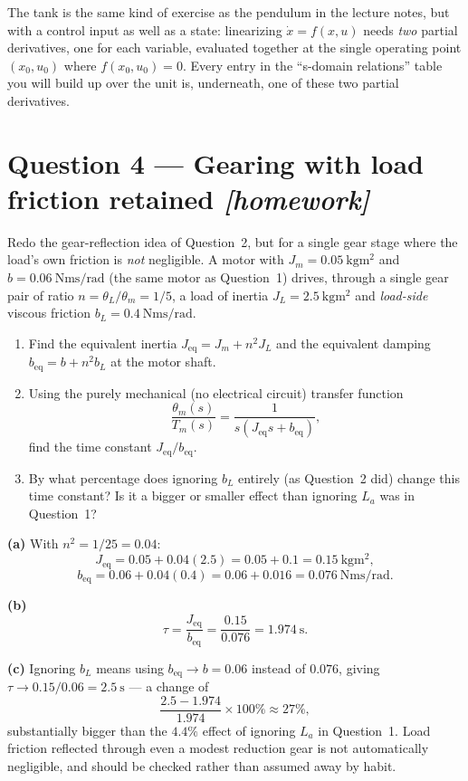\documentclass[11pt,a4paper]{article}
\newcommand{\athome}{\hfill{\small\color{fflag}\itshape[homework]}}
\begin{document}
\begin{keyidea}
The tank is the same kind of exercise as the pendulum in the lecture notes,
but with a control input as well as a state: linearizing
$\dot x=f(x,u)$ needs \emph{two} partial derivatives, one for each variable,
evaluated together at the single operating point $(x_0,u_0)$ where
$f(x_0,u_0)=0$. Every entry in the ``s-domain relations'' table you will build
up over the unit is, underneath, one of these two partial derivatives.
\end{keyidea}

\section*{Question 4 --- Gearing with load friction retained \athome}

Redo the gear-reflection idea of Question~2, but for a single gear stage where
the load's own friction is \emph{not} negligible. A motor with
$J_m=\SI{0.05}{\kilogram\metre\squared}$ and
$b=\SI{0.06}{\newton\metre\second\per\radian}$ (the same motor as
Question~1) drives, through a single gear pair of ratio
$n=\theta_L/\theta_m=1/5$, a load of inertia
$J_L=\SI{2.5}{\kilogram\metre\squared}$ and \emph{load-side} viscous friction
$b_L=\SI{0.4}{\newton\metre\second\per\radian}$.

\begin{enumerate}[label=(\alph*)]
\item Find the equivalent inertia $J_{\text{eq}}=J_m+n^2J_L$ and the
      equivalent damping $b_{\text{eq}}=b+n^2b_L$ at the motor shaft.
\item Using the purely mechanical (no electrical circuit) transfer function
      \[
        \frac{\theta_m(s)}{T_m(s)}=\frac{1}{s(J_{\text{eq}}s+b_{\text{eq}})},
      \]
      find the time constant $J_{\text{eq}}/b_{\text{eq}}$.
\item By what percentage does ignoring $b_L$ entirely (as Question~2 did)
      change this time constant? Is it a bigger or smaller effect than
      ignoring $L_a$ was in Question~1?
\end{enumerate}

\begin{solution}
\textbf{(a)} With $n^2=1/25=0.04$:
\[
  J_{\text{eq}}=0.05+0.04(2.5)=0.05+0.1=\SI{0.15}{\kilogram\metre\squared},
\]
\[
  b_{\text{eq}}=0.06+0.04(0.4)=0.06+0.016=\SI{0.076}{\newton\metre\second\per\radian}.
\]

\medskip
\textbf{(b)}
\[
  \tau=\frac{J_{\text{eq}}}{b_{\text{eq}}}=\frac{0.15}{0.076}=\SI{1.974}{\second}.
\]

\medskip
\textbf{(c)} Ignoring $b_L$ means using $b_{\text{eq}}\to b=0.06$ instead of
$0.076$, giving $\tau\to0.15/0.06=\SI{2.5}{\second}$ --- a change of
\[
  \frac{2.5-1.974}{1.974}\times100\%\approx27\%,
\]
substantially bigger than the $4.4\%$ effect of ignoring $L_a$ in
Question~1. Load friction reflected through even a modest reduction gear is
not automatically negligible, and should be checked rather than assumed away
by habit.
\end{solution}
\end{document}

